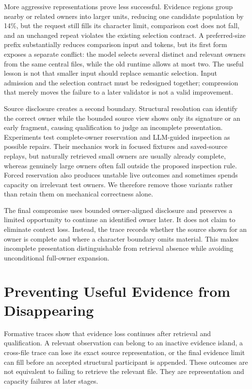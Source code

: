 More aggressive representations prove less successful. Evidence regions group nearby or related owners into larger units, reducing one candidate population by 14\%, but the request still fills its character limit, comparison cost does not fall, and an unchanged repeat violates the existing selection contract. A preferred-size prefix substantially reduces comparison input and tokens, but its first form exposes a separate conflict: the model selects several distinct and relevant owners from the same central files, while the old runtime allows at most two. The useful lesson is not that smaller input should replace semantic selection. Input admission and the selection contract must be redesigned together; compression that merely moves the failure to a later validator is not a valid improvement.

Source disclosure creates a second boundary. Structural resolution can identify the correct owner while the bounded source view shows only its signature or an early fragment, causing qualification to judge an incomplete presentation. Experiments test complete-owner reservation and LLM-guided inspection as possible repairs. Their mechanics work in focused fixtures and saved-source replays, but naturally retrieved small owners are usually already complete, whereas genuinely large owners often fall outside the proposed inspection rule. Forced reservation also produces unstable live outcomes and sometimes spends capacity on irrelevant test owners. We therefore remove those variants rather than retain them on mechanical correctness alone.

The final compromise uses bounded owner-aligned disclosure and preserves a limited opportunity to continue an identified owner later. It does not claim to eliminate context loss. Instead, the trace records whether the source shown for an owner is complete and where a character boundary omits material. This makes incomplete presentation distinguishable from retrieval absence while avoiding unconditional full-owner expansion.

\section{Preventing Useful Evidence from Disappearing}\label{sec:preventing-useful-evidence-from-disappearing}

Formative traces show that evidence loss continues after retrieval and qualification. A relevant observation can belong to an inactive evidence island, a cross-file trace can lose its exact source representation, or the final evidence limit can fill before an accepted structural participant is appended. These outcomes are not equivalent to failing to retrieve the relevant file. They are representation and capacity failures at later stages.

